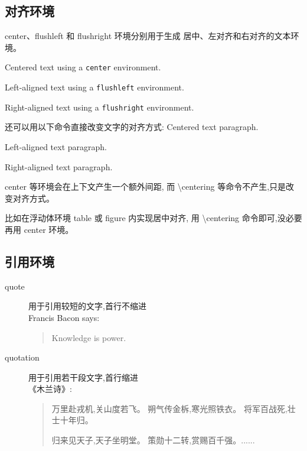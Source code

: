 \documentclass[a4paper]{ctexart}
\begin{document}
\subsection{对齐环境}
center、flushleft 和 flushright 环境分别用于生成%
居中、左对齐和右对齐的文本环境。
\begin{center}
    Centered text using a
    \verb|center| environment.
\end{center}
\begin{flushleft}
    Left-aligned text using a
    \verb|flushleft| environment.
\end{flushleft}
\begin{flushright}
    Right-aligned text using a
    \verb|flushright| environment.
\end{flushright}
还可以用以下命令直接改变文字的对齐方式:
\centering
Centered text paragraph.\par
\raggedright
Left-aligned text paragraph.\par
\raggedleft
Right-aligned text paragraph.\par
\begin{flushleft}
    center 等环境会在上下文产生一个额外间距,%
    而 \textbackslash centering 等命令不产生,只是改变对齐方式。%
\end{flushleft}
\raggedright
比如在浮动体环境 table 或 figure 内实现居中对齐,%
用 \textbackslash centering 命令即可,没必要再用 center 环境。
\subsection{引用环境}
\begin{description}
    \item[quote] 用于引用较短的文字,首行不缩进\\
    Francis Bacon says:
    \begin{quote}
        Knowledge is power.
    \end{quote}
    \item[quotation] 用于引用若干段文字,首行缩进\\
    《木兰诗》:
    \begin{quotation}
        万里赴戎机,关山度若飞。
        朔气传金柝,寒光照铁衣。
        将军百战死,壮士十年归。

        归来见天子,天子坐明堂。
        策勋十二转,赏赐百千强。......
    \end{quotation} 
\end{description}
\end{document}
